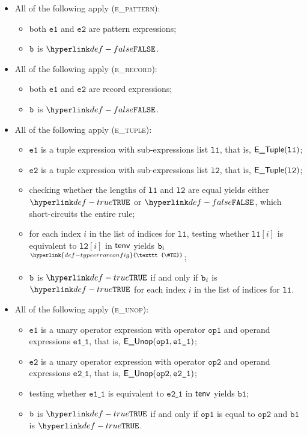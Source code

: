 \documentclass{book}
\newcommand\TypeErrorConfig[0]{\hyperlink{def-typeerrorconfig}{\texttt{\#TE}}}
\newcommand\ProseOrTypeError[0]{\hyperlink{def-proseortypeerror}{$^{\TypeErrorConfig}$}}
\newcommand\veone[0]{\texttt{e1}}
\newcommand\vetwo[0]{\texttt{e2}}
\newcommand\opone[0]{\texttt{op1}}
\newcommand\optwo[0]{\texttt{op2}}
\newcommand\veoneone[0]{\texttt{e1\_1}}
\newcommand\vetwoone[0]{\texttt{e2\_1}}
\newcommand\vbone[0]{\texttt{b1}}
\newcommand\vlone[0]{\texttt{l1}}
\newcommand\vltwo[0]{\texttt{l2}}
\begin{document}
\begin{itemize}
  \item All of the following apply (\textsc{e\_pattern}):
  \begin{itemize}
    \item both $\veone$ and $\vetwo$ are pattern expressions;
    \item $\texttt{b}$ is $\False$.
  \end{itemize}

  \item All of the following apply (\textsc{e\_record}):
  \begin{itemize}
    \item both $\veone$ and $\vetwo$ are record expressions;
    \item $\texttt{b}$ is $\False$.
  \end{itemize}

  \item All of the following apply (\textsc{e\_tuple}):
  \begin{itemize}
    \item $\veone$ is a tuple expression with sub-expressions list $\vlone$,
          that is, $\ETuple(\vlone)$;
    \item $\vetwo$ is a tuple expression with sub-expressions list $\vltwo$,
          that is, $\ETuple(\vltwo)$;
    \item checking whether the lengths of $\vlone$ and $\vltwo$ are equal yields either $\True$ or $\False$, which short-circuits
          the entire rule;
    \item for each index $i$ in the list of indices for $\vlone$, testing whether $\vlone[i]$ is equivalent to $\vltwo[i]$
          in $\textsf{tenv}$ yields $\texttt{b}_i$ \ProseOrTypeError;
    \item $\texttt{b}$ is $\True$ if and only if $\texttt{b}_i$ is $\True$ for each index $i$ in the list of indices for $\vlone$.
  \end{itemize}

  \item All of the following apply (\textsc{e\_unop}):
  \begin{itemize}
    \item $\veone$ is a unary operator expression with operator $\opone$ and operand expressions $\veoneone$,
          that is, $\EUnop(\opone, \veoneone)$;
    \item $\vetwo$ is a unary operator expression with operator $\optwo$ and operand expressions $\vetwoone$,
          that is, $\EUnop(\optwo, \vetwoone)$;
    \item testing whether $\veoneone$ is equivalent to $\vetwoone$ in $\textsf{tenv}$ yields $\vbone$;
    \item $\texttt{b}$ is $\True$ if and only if $\opone$ is equal to $\optwo$ and $\vbone$ is $\True$.
  \end{itemize}


\end{itemize}
\end{document}
